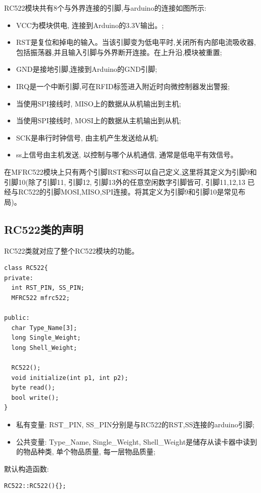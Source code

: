 \documentclass{article}
\begin{document}
RC522模块共有8个与外界连接的引脚,与arduino的连接如图所示:

\begin{itemize}
	\item VCC为模块供电, 连接到Arduino的3.3V输出。;
	\item RST是复位和掉电的输入。当该引脚变为低电平时,关闭所有内部电流吸收器,包括振荡器,并且输入引脚与外界断开连接。在上升沿,模块被重置;
	\item GND是接地引脚,连接到Arduino的GND引脚;
	\item IRQ是一个中断引脚,可在RFID标签进入附近时向微控制器发出警报;
	\item 当使用SPI接线时, MISO上的数据从从机输出到主机;
	\item 当使用SPI接线时, MOSI上的数据从主机输出到从机;
	\item SCK是串行时钟信号, 由主机产生发送给从机;
	\item ss上信号由主机发送, 以控制与哪个从机通信, 通常是低电平有效信号。
\end{itemize}

在MFRC522模块上只有两个引脚RST和SS可以自己定义,这里将其定义为引脚9和引脚10(除了引脚11, 引脚12, 引脚13外的任意空闲数字引脚皆可, 引脚11,12,13
已经与RC522的引脚MOSI,MISO,SPI连接。将其定义为引脚9和引脚10是常见布局)。

\subsection{RC522类的声明}
RC522类就对应了整个RC522模块的功能。
\begin{lstlisting}
class RC522{
private:
  int RST_PIN, SS_PIN;
  MFRC522 mfrc522;                                           

public:
  char Type_Name[3];  
  long Single_Weight;
  long Shell_Weight;

  RC522();
  void initialize(int p1, int p2);
  byte read();
  bool write();
}	
\end{lstlisting}

\begin{itemize}
	\item 私有变量: RST\_PIN, SS\_PIN分别是与RC522的RST,SS连接的arduino引脚;
	\item 公共变量: Type\_Name, Single\_Weight, Shell\_Weight是储存从读卡器中读到的物品种类, 单个物品质量, 每一层物品质量;
\end{itemize}

默认构造函数:
\begin{lstlisting}
RC522::RC522(){};	
\end{lstlisting}
\end{document}

